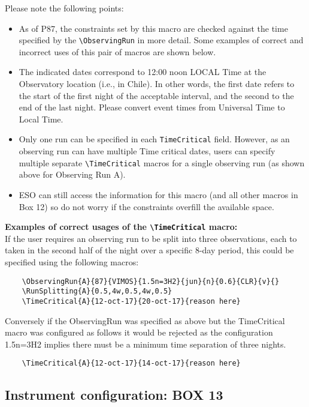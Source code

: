 \documentclass{article}
\begin{document}
Please note the following points:
\begin{itemize}
\item As of P87, the constraints set by this macro are checked against the
time specified by the \verb|\ObservingRun| in more detail.
Some examples of correct and incorrect uses of this pair of macros are shown below.
\item The indicated dates correspond to 12:00 noon LOCAL Time at
the Observatory location (i.e., in Chile). In other words, the first
date refers to the start of the first night of the acceptable
interval, and the second to the end of the last night. Please 
convert event times from Universal Time to Local Time.
\item Only one run can be specified in each \verb|TimeCritical| field. 
However, as an observing run can have multiple Time critical dates, users
can specify multiple separate \verb|\TimeCritical| macros for a single observing run (as shown above
for Observing Run A).
\item ESO can still access the information for this macro (and all other macros in Box 12) so
do not worry if the constraints overfill the available space.
\end{itemize}

{\bf Examples of correct usages of the \verb|\TimeCritical| macro: }\\
If the user requires an observing run to be split into three observations, each to taken in the 
second half of the night over a specific 8-day period, this could be specified using the following macros:
\begin{verbatim}
    \ObservingRun{A}{87}{VIMOS}{1.5n=3H2}{jun}{n}{0.6}{CLR}{v}{}
    \RunSplitting{A}{0.5,4w,0.5,4w,0.5}
    \TimeCritical{A}{12-oct-17}{20-oct-17}{reason here}
\end{verbatim}

Conversely if the ObservingRun was specified as above but the TimeCritical macro was configured as follows
it would be rejected as the configuration 1.5n=3H2 implies there must be a minimum time separation of
three nights.
\begin{verbatim}
    \TimeCritical{A}{12-oct-17}{14-oct-17}{reason here}
\end{verbatim}








\subsection{Instrument configuration: {\bf BOX 13}}
\end{document}
